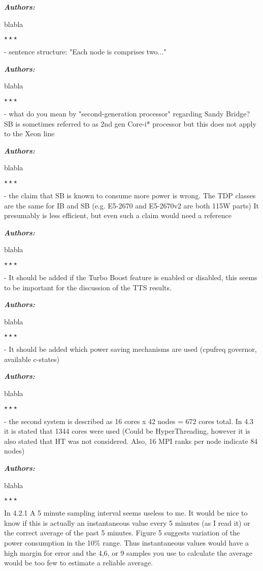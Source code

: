 \documentclass[a4paper,11pt]{article}
\newcounter{question}
\newcommand{\weReply}{\vspace{0.25cm} {\bf \noindent } \addtocounter{question}{1} \textbf{\emph{Authors:}} \medskip \em\par}
\newenvironment{weSay}{\bigskip \weReply \begin{it}}{\end{it}\begin{center} \samepage$\star \star \star$ \end{center}}
\begin{document}
\begin{weSay}
blabla
\end{weSay}

- sentence structure: "Each node is comprises two..."

\begin{weSay}
blabla
\end{weSay}

- what do you mean by "second-generation processor" regarding Sandy Bridge?
     SB is sometimes referred to as 2nd gen Core-i* processor but this does not
     apply to the Xeon line

\begin{weSay}
blabla
\end{weSay}

- the claim that SB is known to consume more power is wrong. The TDP classes
     are the same for IB and SB (e.g. E5-2670 and E5-2670v2 are both 115W parts)
     It presumably is less efficient, but even such a claim would need a reference

\begin{weSay}
blabla
\end{weSay}

- It should be added if the Turbo Boost feature is enabled or disabled, this
     seems to be important for the discussion of the TTS results.

\begin{weSay}
blabla
\end{weSay}

- It should be added which power saving mechanisms are used (cpufreq
     governor, available c-states)

\begin{weSay}
blabla
\end{weSay}

- the second system is described as 16 cores x 42 nodes = 672 cores total. In
     4.3 it is stated that 1344 cores were used (Could be HyperThreading, however
     it is also stated that HT was not considered. Also, 16 MPI ranks per node
     indicate 84 nodes)

\begin{weSay}
blabla
\end{weSay}

In 4.2.1
A 5 minute sampling interval seems useless to me. It would be nice to know if
this is actually an instantaneous value every 5 minutes (as I read it) or the
correct average of the past 5 minutes. Figure 5 suggests variation of the power
consumption in the 10\% range. Thus instantaneous values would have a high margin
for error and the 4,6, or 9 samples you use to calculate the average would be
too few to estimate a reliable average.
\end{document}
